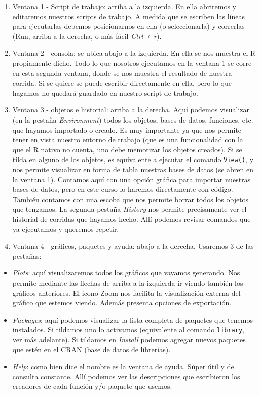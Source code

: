 \documentclass[
]{article}
\providecommand{\tightlist}{%
  \setlength{\itemsep}{0pt}\setlength{\parskip}{0pt}}
\begin{document}
\begin{enumerate}
\def\labelenumi{\arabic{enumi}.}
\item
  Ventana 1 - Script de trabajo: arriba a la izquierda. En ella
  abriremos y editaremos nuestros scripts de trabajo. A medida que se
  escriben las líneas para ejecutarlas debemos posicionarnos en ella (o
  seleccionarla) y correrlas (Run, arriba a la derecha, o más fácil
  \emph{Ctrl + r}).
\item
  Ventana 2 - consola: se ubica abajo a la izquierda. En ella se nos
  muestra el R propiamente dicho. Todo lo que nosotros ejecutamos en la
  ventana 1 se corre en esta segunda ventana, donde se nos muestra el
  resultado de nuestra corrida. Si se quiere se puede escribir
  directamente en ella, pero lo que hagamos no quedará guardado en
  nuestro script de trabajo.
\item
  Ventana 3 - objetos e historial: arriba a la derecha. Aquí podemos
  visualizar (en la pestaña \emph{Environment}) todos los objetos, bases
  de datos, funciones, etc. que hayamos importado o creado. Es muy
  importante ya que nos permite tener en vista nuestro entorno de
  trabajo (que es una funcionalidad con la que el R nativo no cuenta,
  uno debe memorizar los objetos creados). Si se tilda en alguno de los
  objetos, es equivalente a ejecutar el comando \texttt{View()}, y nos
  permite visualizar en forma de tabla nuestras bases de datos (se abren
  en la ventana 1). Contamos aquí con una opción gráfica para importar
  nuestras bases de datos, pero en este curso lo haremos directamente
  con código. También contamos con una escoba que nos permite borrar
  todos los objetos que tengamos. La segunda pestaña \emph{History} nos
  permite precisamente ver el historial de corridas que hayamos hecho.
  Allí podemos revisar comandos que ya ejecutamos y queremos repetir.
\item
  Ventana 4 - gráficos, paquetes y ayuda: abajo a la derecha. Usaremos 3
  de las pestañas:
\end{enumerate}

\begin{itemize}
\tightlist
\item
  \emph{Plots}: aquí visualizaremos todos los gráficos que vayamos
  generando. Nos permite mediante las flechas de arriba a la izquierda
  ir viendo también los gráficos anteriores. El icono Zoom nos facilita
  la visualización externa del gráfico que estemos viendo. Además
  presenta opciones de exportación.
\item
  \emph{Packages}: aquí podemos visualizar la lista completa de paquetes
  que tenemos instalados. Si tildamos uno lo activamos (equivalente al
  comando \texttt{library}, ver más adelante). Si tildamos en
  \emph{Install} podemos agregar nuevos paquetes que estén en el CRAN
  (base de datos de librerías).
\item
  \emph{Help}: como bien dice el nombre es la ventana de ayuda. Súper
  útil y de consulta constante. Allí podemos ver las descripciones que
  escribieron los creadores de cada función y/o paquete que usemos.
\end{itemize}
\end{document}
